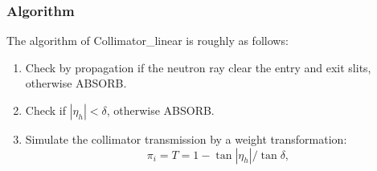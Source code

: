 \subsubsection{Algorithm}
The algorithm of \textrm{Collimator\_linear} is roughly as follows:
\begin{enumerate}
\item Check by propagation if the neutron ray clear the entry and exit slits,
otherwise ABSORB.
\item Check if $|\eta_h| < \delta$, otherwise ABSORB.
\item Simulate the collimator transmission by a weight transformation:
\begin{equation}
\pi_i = T = 1-\tan|\eta_h|/ \tan\delta ,
\end{equation}
\end{enumerate}
